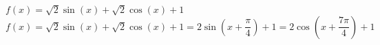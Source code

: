 {$f(x) = \sqrt{2}\sin(x) + \sqrt{2}\cos(x) + 1$\label{expandedsinusoidexerfirst}} 
{$f(x) = \sqrt{2}\sin(x) + \sqrt{2}\cos(x) + 1 = 2\sin\left(x + \dfrac{\pi}{4}\right) + 1 = 2\cos\left(x + \dfrac{7\pi}{4}\right) + 1$ }